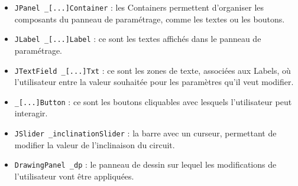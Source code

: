 \documentclass{report}
\begin{document}
\begin{itemize}
\item \texttt{JPanel \_[...]Container} : les Containers permettent d'organiser les composants du panneau de paramétrage, comme les textes ou les boutons.
\item \texttt{JLabel \_[...]Label} : ce sont les textes affichés dans le panneau de paramétrage.
\item \texttt{JTextField \_[...]Txt} : ce sont les zones de texte, associées aux Labels, où l'utilisateur entre la valeur souhaitée pour les paramètres qu'il veut modifier.
\item \texttt{\_[...]Button} : ce sont les boutons cliquables avec lesquels l'utilisateur peut interagir.
\item \texttt{JSlider \_inclinationSlider} : la barre avec un curseur, permettant de modifier la valeur de l'inclinaison du circuit.
\item \texttt{DrawingPanel \_dp} : le panneau de dessin sur lequel les modifications de l'utilisateur vont être appliquées.
\end{itemize}
\end{document}

